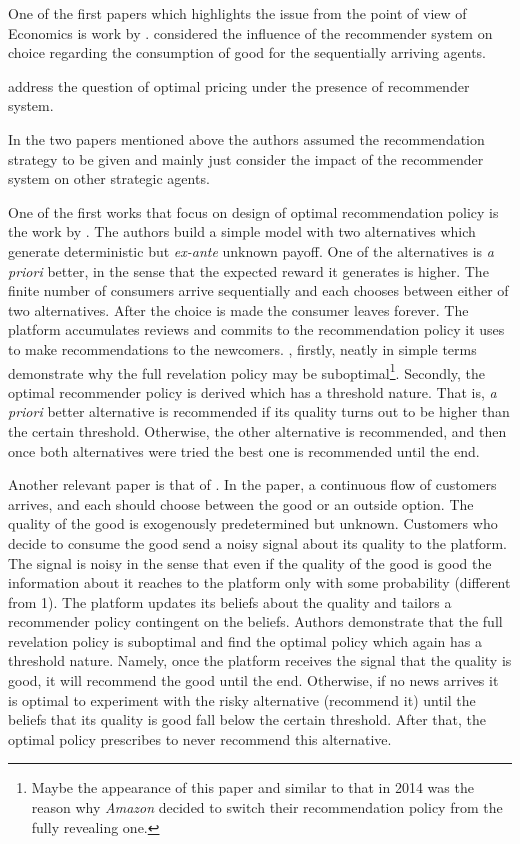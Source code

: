 \documentclass[a4paper]{article}
\begin{document}
	One of the first papers which highlights the issue from the point of view of Economics is work by \cite{avery1999market}. \cite{avery1999market} considered the influence of the recommender system on choice regarding the consumption of good for the sequentially arriving agents.
		
		
		
	\cite{bergemann2006optimal} address the question of optimal pricing under the presence of recommender system.
	
	
	In the two papers mentioned above the authors assumed the recommendation strategy to be given and mainly just consider the impact of the recommender system on other strategic agents. 
	
	
	
	One of the first works that focus on design of optimal recommendation policy is the work by \cite{kremer2014}. The authors build a simple model with two alternatives which generate deterministic but \textit{ex-ante} unknown payoff. One of the alternatives is \textit{a priori} better, in the sense that the expected reward it generates is higher. The finite number of consumers arrive sequentially and each chooses between either of two alternatives. After the choice is made the consumer leaves forever. The platform accumulates reviews and commits to the recommendation policy it uses to make recommendations to the newcomers. \cite{kremer2014}, firstly, neatly in simple terms demonstrate why the full revelation policy may be suboptimal\footnote{Maybe the appearance of this paper and similar to that in 2014 was the reason why \textit{Amazon} decided to switch their recommendation policy from the fully revealing one.}. Secondly, the optimal recommender policy is derived which has a threshold nature. That is, \textit{a priori} better alternative is recommended if its quality turns out to be higher than the certain threshold. Otherwise, the other alternative is recommended, and then once both alternatives were tried the best one is recommended until the end. 
	
	
	
	
	Another relevant paper is that of \cite{che2015}. In the paper, a continuous flow of customers arrives, and each should choose between the good or an outside option. The quality of the good is exogenously predetermined but unknown. Customers who decide to consume the good send a noisy signal about its quality to the platform. The signal is noisy in the sense that even if the quality of the good is good the information about it reaches to the platform only with some probability (different from 1). The platform updates its beliefs about the quality and tailors a recommender policy contingent on the beliefs. Authors demonstrate that the full revelation policy is suboptimal and find the optimal policy which again has a threshold nature. Namely, once the platform receives the signal that the quality is good, it will recommend the good until the end. Otherwise, if no news arrives it is optimal to experiment with the risky alternative (recommend it) until the beliefs that its quality is good fall below the certain threshold. After that, the optimal policy prescribes to never recommend this alternative.
	
\end{document}
